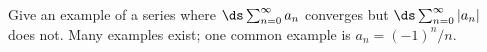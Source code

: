 {Give an example of a series where $\ds \sum_{n=0}^\infty a_n$ converges but $\ds \sum_{n=0}^\infty |a_n|$ does not.
}
{Many examples exist; one common example is $a_n = (-1)^n/n$.
}